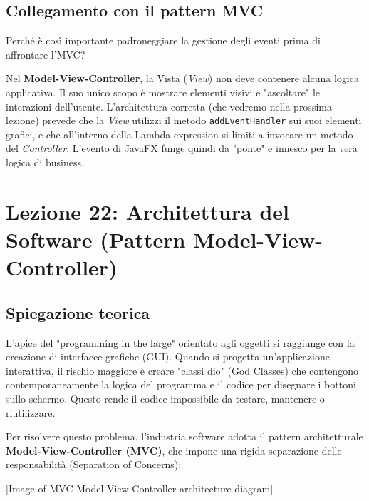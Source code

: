 \documentclass[12pt, a4paper]{article}
\begin{document}
\subsection{Collegamento con il pattern MVC}
Perché è così importante padroneggiare la gestione degli eventi prima di affrontare l'MVC? 

Nel \textbf{Model-View-Controller}, la Vista (\textit{View}) non deve contenere alcuna logica applicativa. Il suo unico scopo è mostrare elementi visivi e "ascoltare" le interazioni dell'utente. L'architettura corretta (che vedremo nella prossima lezione) prevede che la \textit{View} utilizzi il metodo \texttt{addEventHandler} sui suoi elementi grafici, e che all'interno della Lambda expression si limiti a invocare un metodo del \textit{Controller}. L'evento di JavaFX funge quindi da "ponte" e innesco per la vera logica di business.

\newpage

\section{Lezione 22: Architettura del Software (Pattern Model-View-Controller)}

\subsection{Spiegazione teorica}
L'apice del "programming in the large" orientato agli oggetti si raggiunge con la creazione di interfacce grafiche (GUI). Quando si progetta un'applicazione interattiva, il rischio maggiore è creare "classi dio" (God Classes) che contengono contemporaneamente la logica del programma e il codice per disegnare i bottoni sullo schermo. Questo rende il codice impossibile da testare, mantenere o riutilizzare.

Per risolvere questo problema, l'industria software adotta il pattern architetturale \textbf{Model-View-Controller (MVC)}, che impone una rigida separazione delle responsabilità (Separation of Concerns):



[Image of MVC Model View Controller architecture diagram]
\end{document}

